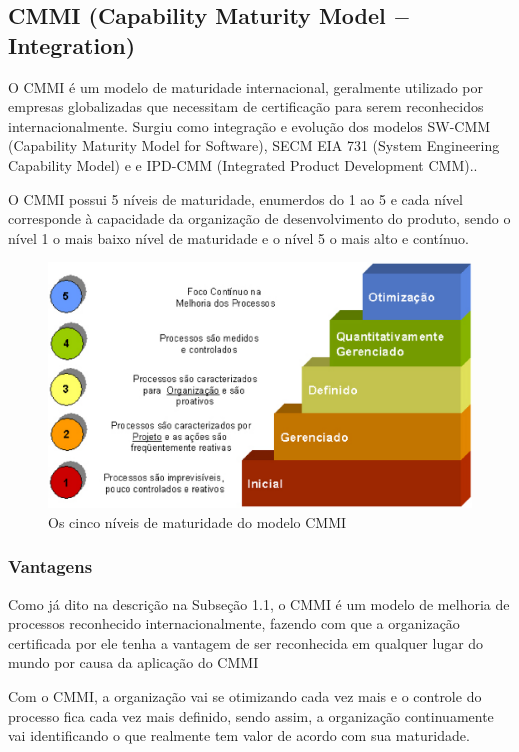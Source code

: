 \subsection{CMMI (Capability Maturity Model $-$ Integration)}

  O CMMI é um modelo de maturidade internacional, geralmente utilizado por empresas
  globalizadas que necessitam de certificação para serem reconhecidos internacionalmente.
  Surgiu como integração e evolução dos modelos SW-CMM (Capability Maturity Model for Software),
  SECM EIA 731 (System Engineering Capability Model) e  e IPD-CMM
  (Integrated Product Development CMM).\cite{mct2006}.

  O CMMI possui 5 níveis de maturidade, enumerdos do 1 ao 5 e cada nível corresponde
  à capacidade da organização de desenvolvimento do produto, sendo o nível 1 o mais
  baixo nível de maturidade e o nível 5 o mais alto e contínuo.

  \begin{figure}[!ht]
    \centering
    \includegraphics[width=15cm, keepaspectratio=true]{figuras/maturidade/niveis-cmmi.eps}
    \caption{Os cinco níveis de maturidade do modelo CMMI}
  \end{figure}

\subsubsection{Vantagens}

  Como já dito na descrição na Subseção 1.1, o CMMI é um modelo de melhoria
  de processos reconhecido internacionalmente, fazendo com que a organização
  certificada por ele tenha a vantagem de ser reconhecida em qualquer lugar
  do mundo por causa da aplicação do CMMI

  Com o CMMI, a organização vai se otimizando cada vez mais e o controle do
  processo fica cada vez mais definido, sendo assim, a organização continuamente
  vai identificando o que realmente tem valor de acordo com sua maturidade.


